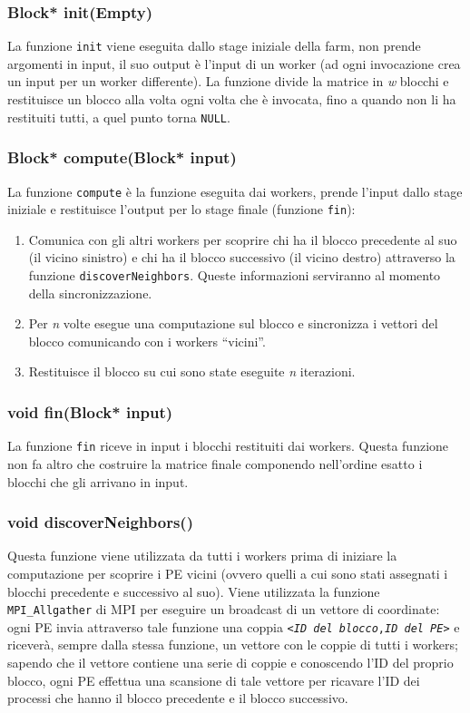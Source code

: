 \subsubsection*{Block* init(Empty)}
La funzione \texttt{init} viene eseguita dallo stage iniziale della farm, non prende argomenti in input, il suo output \`e l'input di un worker (ad ogni invocazione crea un input per un worker differente). La funzione divide la matrice in \textit{w} blocchi e restituisce un blocco alla volta ogni volta che \`e invocata, fino a quando non li ha restituiti tutti, a quel punto torna \texttt{NULL}.

\subsubsection*{Block* compute(Block* input)}
La funzione \texttt{compute} \`e la funzione eseguita dai workers, prende l'input dallo stage iniziale e restituisce l'output per lo stage finale (funzione \texttt{fin}):
\begin{enumerate}
  \item Comunica con gli altri workers per scoprire chi ha il blocco precedente al suo (il vicino sinistro) e chi ha il blocco successivo (il vicino destro) attraverso la funzione \texttt{discoverNeighbors}. Queste informazioni serviranno al momento della sincronizzazione.
  \item Per \textit{n} volte esegue una computazione sul blocco e sincronizza i vettori del blocco comunicando con i workers ``vicini''.
  \item Restituisce il blocco su cui sono state eseguite \textit{n} iterazioni.
\end{enumerate}

\subsubsection*{void fin(Block* input)}
La funzione \texttt{fin} riceve in input i blocchi restituiti dai workers. Questa funzione non fa altro che costruire la matrice finale componendo nell'ordine esatto i blocchi che gli arrivano in input.

\subsubsection*{void discoverNeighbors()}
Questa funzione viene utilizzata da tutti i workers prima di iniziare la computazione per scoprire i PE vicini (ovvero quelli a cui sono stati assegnati i blocchi precedente e successivo al suo). Viene utilizzata la funzione \texttt{MPI\_Allgather} di MPI per eseguire un broadcast di un vettore di coordinate: ogni PE invia attraverso tale funzione una coppia \texttt{<\textit{ID del blocco},\textit{ID del PE}>} e ricever\`a, sempre dalla stessa funzione, un vettore con le coppie di tutti i workers; sapendo che il vettore contiene una serie di coppie e conoscendo l'ID del proprio blocco, ogni PE effettua una scansione di tale vettore per ricavare l'ID dei processi che hanno il blocco precedente e il blocco successivo.

